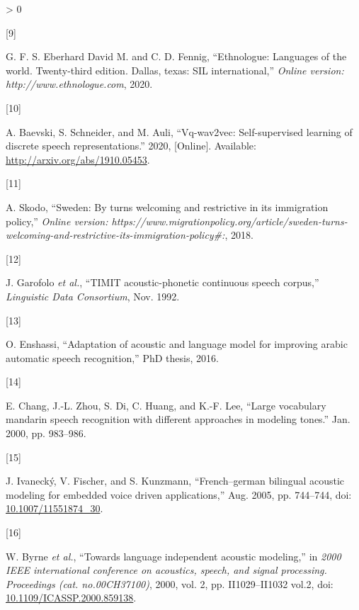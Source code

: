 \documentclass[
  a4paper,
]{article}
\newlength{\cslhangindent}
\newlength{\csllabelwidth}
\newenvironment{CSLReferences}[2] %
 {%
  \setlength{\parindent}{0pt}
  \ifodd #1 \everypar{\setlength{\hangindent}{\cslhangindent}}\ignorespaces\fi
  \ifnum #2 > 0
  \setlength{\parskip}{#2\baselineskip}
  \fi
 }%
 {}
\newcommand{\CSLLeftMargin}[1]{\parbox[t]{\csllabelwidth}{#1}}
\newcommand{\CSLRightInline}[1]{\parbox[t]{\linewidth - \csllabelwidth}{#1}\break}
\begin{document}
\begin{CSLReferences}{0}{0}
\leavevmode\hypertarget{ref-Ethnologue}{}%
\CSLLeftMargin{{[}9{]} }
\CSLRightInline{G. F. S. Eberhard David M. and C. D. Fennig,
{``Ethnologue: Languages of the world. Twenty-third edition. Dallas,
texas: SIL international,''} \emph{Online version:
http://www.ethnologue.com}, 2020.}

\leavevmode\hypertarget{ref-baevski2020vqwav2vec}{}%
\CSLLeftMargin{{[}10{]} }
\CSLRightInline{A. Baevski, S. Schneider, and M. Auli, {``Vq-wav2vec:
Self-supervised learning of discrete speech representations.''} 2020,
{[}Online{]}. Available: \url{http://arxiv.org/abs/1910.05453}.}

\leavevmode\hypertarget{ref-migrationpolicy}{}%
\CSLLeftMargin{{[}11{]} }
\CSLRightInline{A. Skodo, {``Sweden: By turns welcoming and restrictive
in its immigration policy,''} \emph{Online version:
https://www.migrationpolicy.org/article/sweden-turns-welcoming-and-restrictive-its-immigration-policy\#:},
2018.}

\leavevmode\hypertarget{ref-timit}{}%
\CSLLeftMargin{{[}12{]} }
\CSLRightInline{J. Garofolo \emph{et al.}, {``TIMIT acoustic-phonetic
continuous speech corpus,''} \emph{Linguistic Data Consortium}, Nov.
1992.}

\leavevmode\hypertarget{ref-phdthesis}{}%
\CSLLeftMargin{{[}13{]} }
\CSLRightInline{O. Enshassi, {``Adaptation of acoustic and language
model for improving arabic automatic speech recognition,''} PhD thesis,
2016.}

\leavevmode\hypertarget{ref-inproceedings}{}%
\CSLLeftMargin{{[}14{]} }
\CSLRightInline{E. Chang, J.-L. Zhou, S. Di, C. Huang, and K.-F. Lee,
{``Large vocabulary mandarin speech recognition with different
approaches in modeling tones.''} Jan. 2000, pp. 983--986.}

\leavevmode\hypertarget{ref-inproceedings1}{}%
\CSLLeftMargin{{[}15{]} }
\CSLRightInline{J. Ivanecký, V. Fischer, and S. Kunzmann,
{``French--german bilingual acoustic modeling for embedded voice driven
applications,''} Aug. 2005, pp. 744--744, doi:
\href{https://doi.org/10.1007/11551874_30}{10.1007/11551874\_30}.}

\leavevmode\hypertarget{ref-859138}{}%
\CSLLeftMargin{{[}16{]} }
\CSLRightInline{W. Byrne \emph{et al.}, {``Towards language independent
acoustic modeling,''} in \emph{2000 IEEE international conference on
acoustics, speech, and signal processing. Proceedings (cat.
no.00CH37100)}, 2000, vol. 2, pp. II1029--II1032 vol.2, doi:
\href{https://doi.org/10.1109/ICASSP.2000.859138}{10.1109/ICASSP.2000.859138}.}


\end{CSLReferences}
\end{document}
